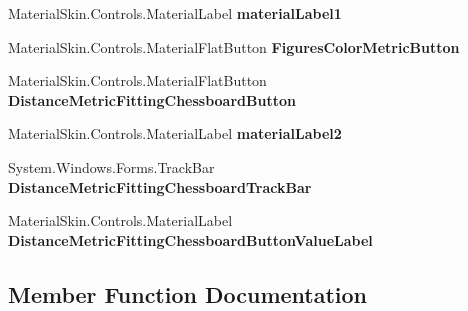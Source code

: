 \begin{DoxyCompactItemize}
\item 
\mbox{\label{class_chess_tracking_1_1_user_interface_1_1_advanced_settings_form_a16f3cbd11855122bb692b590b2ac1b38}} 
Material\+Skin.\+Controls.\+Material\+Label {\bfseries material\+Label1}
\item 
\mbox{\label{class_chess_tracking_1_1_user_interface_1_1_advanced_settings_form_a210c4dc03a96fb2fc91791ef9b47dc0e}} 
Material\+Skin.\+Controls.\+Material\+Flat\+Button {\bfseries Figures\+Color\+Metric\+Button}
\item 
\mbox{\label{class_chess_tracking_1_1_user_interface_1_1_advanced_settings_form_a7cac553843f420d366824592f2c6e8e1}} 
Material\+Skin.\+Controls.\+Material\+Flat\+Button {\bfseries Distance\+Metric\+Fitting\+Chessboard\+Button}
\item 
\mbox{\label{class_chess_tracking_1_1_user_interface_1_1_advanced_settings_form_a13ffa6cbacf5f5128bc8d7dd4ff9b671}} 
Material\+Skin.\+Controls.\+Material\+Label {\bfseries material\+Label2}
\item 
\mbox{\label{class_chess_tracking_1_1_user_interface_1_1_advanced_settings_form_a4aaa214dd9ae340ea262d84cf42bb6a2}} 
System.\+Windows.\+Forms.\+Track\+Bar {\bfseries Distance\+Metric\+Fitting\+Chessboard\+Track\+Bar}
\item 
\mbox{\label{class_chess_tracking_1_1_user_interface_1_1_advanced_settings_form_a6a7e97680e6be43bceb5b529496044fa}} 
Material\+Skin.\+Controls.\+Material\+Label {\bfseries Distance\+Metric\+Fitting\+Chessboard\+Button\+Value\+Label}
\end{DoxyCompactItemize}


\subsection{Member Function Documentation}
\mbox{\label{class_chess_tracking_1_1_user_interface_1_1_advanced_settings_form_af2a4b6fa07248148f528d5c5a6425b27}} 
